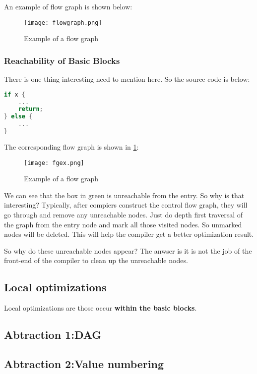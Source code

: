 An example of flow graph is shown below:

\begin{figure}[h]
    \centering
    \texttt{[image: flowgraph.png]}
    \caption{Example of a flow graph}
\end{figure}

\subsubsection{Reachability of Basic Blocks}

There is one thing interesting need to mention here. So the source code is below:

\begin{lstlisting}[language=C, caption=An example]
if x { 
    ...
    return;
} else {
    ...
}


\end{lstlisting}


The corresponding flow graph is shown in \ref{fig:fgex}:

\begin{figure}[h]
    \centering
    \texttt{[image: fgex.png]}
    \caption{Example of a flow graph}
    \label{fig:fgex}
\end{figure}


We can see that the box in green is unreachable from the entry. So why is that interesting? Typically, after compiers 
construct the control flow graph, they will go through and remove any unreachable nodes. Just do depth first traversal of the graph
from the entry node and mark all those visited nodes. So unmarked nodes will be deleted. This will help the compiler get a better optimization
result.


So why do these unreachable nodes appear? The anwser is it is not the job of the front-end of the compiler to clean up the unreachable nodes. 



\subsection{Local optimizations}

Local optimizations are those occur \textbf{within the basic blocks}. 
\subsection{Abtraction 1:DAG}


\subsection{Abtraction 2:Value numbering} 





